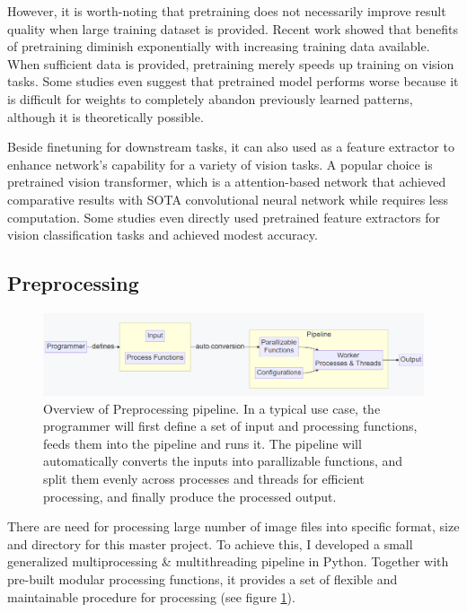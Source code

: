 However, it is worth-noting that pretraining does not necessarily improve result quality when large training dataset is provided. Recent work showed that benefits of pretraining diminish exponentially with increasing training data available. When sufficient data is provided, pretraining merely speeds up training on vision tasks\cite{heRethinkingImageNetPretraining2018}. Some studies even suggest that pretrained model performs worse because it is difficult for weights to completely abandon previously learned patterns, although it is theoretically possible\cite{el-noubyAreLargescaleDatasets2021}. 

Beside finetuning for downstream tasks, it can also used as a feature extractor to enhance network's capability for a variety of vision tasks. A popular choice is pretrained vision transformer\cite{dosovitskiyImageWorth16x162021}, which is a attention-based network that achieved comparative results with SOTA convolutional neural network while requires less computation. Some studies even directly used pretrained feature extractors for vision classification tasks and achieved modest accuracy\cite{awaisCanPretrainedConvolutional2020}.


\subsection{Preprocessing}

\begin{figure}
    \centering
    \includegraphics[width=1.0\textwidth]{images/introduction/preprocess_pipeline.png}
    \caption{Overview of Preprocessing pipeline. In a typical use case, the programmer will first define a set of input and processing functions, feeds them into the pipeline and runs it. The pipeline will automatically converts the inputs into parallizable functions, and split them evenly across processes and threads for efficient processing, and finally produce the processed output.} 
    \label{fig:preprocess_pipeline}
\end{figure}

There are need for processing large number of image files into specific format, size and directory for this master project. To achieve this, I developed a small generalized multiprocessing \& multithreading pipeline in Python\cite{WelcomePythonOrg}. Together with pre-built modular processing functions, it provides a set of flexible and maintainable procedure for processing (see figure \ref{fig:preprocess_pipeline}).




